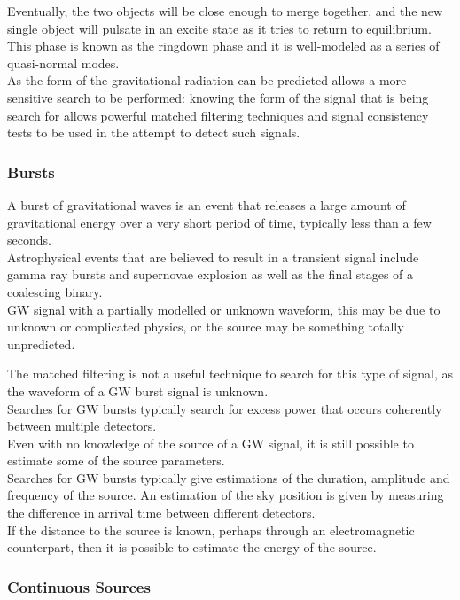 \documentclass[binding=0.6cm, LaM]{sapthesis}
\begin{document}
	Eventually, the two objects will be close enough to merge together, 
	and the new single object will pulsate in an excite state as it tries to return to equilibrium. 
	This phase is known as the ringdown phase and it is well-modeled as a series of quasi-normal modes. \\ 
	As the form of the gravitational radiation can be predicted allows 
	a more sensitive search to be performed: knowing the form of the signal 
	that is being search for allows powerful matched filtering techniques 
	and signal consistency tests to be used in the attempt to detect such signals.


\subsubsection{Bursts}

	A burst of gravitational waves is an event that releases a large amount 
	of gravitational energy over a very short period of time, typically less than a few seconds. \\ 
	Astrophysical events that are believed to result in a transient signal 
	include gamma ray bursts and supernovae explosion as well as the final stages of a coalescing binary. \\
	GW signal with a partially modelled or unknown waveform, 
	this may be due to unknown or complicated physics, or the source may be something totally unpredicted. 

	The matched filtering is not a useful technique to search for this type of signal, 
	as the waveform of a GW burst signal is unknown. \\
	Searches for GW bursts typically search for excess power that occurs coherently between multiple detectors. \\ 
	Even with no knowledge of the source of a GW signal, 
	it is still possible to estimate some of the source parameters. \\
	Searches for GW bursts typically give estimations of the duration, 
	amplitude and frequency of the source. 
	An estimation of the sky position is given by measuring the difference 
	in arrival time between different detectors. \\
	If the distance to the source is known, 
	perhaps through an electromagnetic counterpart, 
	then it is possible to estimate the energy of the source. 


\subsubsection{Continuous Sources}
\end{document}
